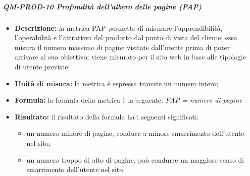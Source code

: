 			\subparagraph{QM-PROD-10 Profondità dell'albero delle pagine (PAP)}
			\begin{itemize}
      			\item \textbf{Descrizione: }
					la metrica PAP permette di misurare l'apprendibilità, l'operabilità e l'attrattiva del prodotto dal punto di vista del cliente; essa misura il numero massimo di pagine visitate dall'utente prima di poter arrivare al suo obiettivo; viene misurato per il sito web in base alle tipologie di utente previste;
				\item \textbf{Unità di misura: }
					la metrica è espressa tramite un numero intero;
				\item \textbf{Formula: }
					la formula della metrica è la seguente:
					\textit{PAP = numero di pagine}
				\item \textbf{Risultato: }
					il risultato della formula ha i seguenti significati:
					\begin{itemize}
						\item un numero minore di pagine, conduce a minore smarrimento dell'utente nel sito;
						\item un numero troppo di alto di pagine, può condurre un maggiore senso di smarrimento dell'utente nel sito.
					\end{itemize}
			\end{itemize}



